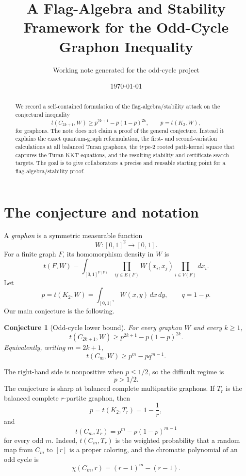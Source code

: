 \documentclass[11pt]{article}
\title{A Flag-Algebra and Stability Framework for the Odd-Cycle Graphon Inequality}
\author{Working note generated for the odd-cycle project}
\date{\today}
\newtheorem{conjecture}[theorem]{Conjecture}
\theoremstyle{definition}
\newcommand{\dd}{\,d}
\begin{document}
\maketitle

\begin{abstract}
We record a self-contained formulation of the flag-algebra/stability attack on the conjectural inequality
\[
        t(C_{2k+1},W)\ge p^{2k+1}-p(1-p)^{2k},
        \qquad p=t(K_2,W),
\]
for graphons.  The note does not claim a proof of the general conjecture.  Instead it explains the exact quantum-graph reformulation, the first- and second-variation calculations at all balanced Turan graphons, the type-2 rooted path-kernel square that captures the Turan KKT equations, and the resulting stability and certificate-search targets.  The goal is to give collaborators a precise and reusable starting point for a flag-algebra/stability proof.
\end{abstract}

\tableofcontents

\section{The conjecture and notation}

A \emph{graphon} is a symmetric measurable function
\[
        W:[0,1]^2\to[0,1].
\]
For a finite graph $F$, its homomorphism density in $W$ is
\[
        t(F,W)=\int_{[0,1]^{V(F)}}\prod_{ij\in E(F)} W(x_i,x_j)\prod_{i\in V(F)}dx_i.
\]
Let
\[
        p=t(K_2,W)=\int_{[0,1]^2}W(x,y)\dd x\dd y,
        \qquad q=1-p.
\]
Our main conjecture is the following.

\begin{conjecture}[Odd-cycle lower bound]
For every graphon $W$ and every $k\ge1$,
\[
        t(C_{2k+1},W)\ge p^{2k+1}-p(1-p)^{2k}.
\]
Equivalently, writing $m=2k+1$,
\[
        t(C_m,W)\ge p^m-pq^{m-1}.
\]
\end{conjecture}

The right-hand side is nonpositive when $p\le1/2$, so the difficult regime is
\[
        p>1/2.
\]
The conjecture is sharp at balanced complete multipartite graphons.  If $T_r$ is the balanced complete $r$-partite graphon, then
\[
        p=t(K_2,T_r)=1-\frac1r,
\]
and
\[
        t(C_m,T_r)=p^m-p(1-p)^{m-1}
\]
for every odd $m$.  Indeed, $t(C_m,T_r)$ is the weighted probability that a random map from $C_m$ to $[r]$ is a proper coloring, and the chromatic polynomial of an odd cycle is
\[
        \chi(C_m,r)=(r-1)^m-(r-1).
\]
\end{document}
